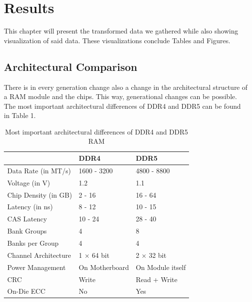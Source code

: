 \section{Results}

This chapter will present the transformed data we gathered while also showing visualization of said data. These visualizations conclude Tables and Figures.

\subsection{Architectural Comparison}

There is in every generation change also a change in the architectural structure of a RAM module and the chips. This way, generational changes can be possible. The most important architectural differences of DDR4 and DDR5 can be found in Table 1.

\begin{table}[H]
    \centering
    \begin{tabular}{|m{5cm}|P{3cm}|P{3cm}|}
    \hline
                         & \textbf{DDR4}  & \textbf{DDR5}    \\ \hline
    Data Rate (in MT/s)  & 1600 - 3200    & 4800 - 8800      \\ \hline
    Voltage (in V)       & 1.2            & 1.1              \\ \hline
    Chip Density (in GB) & 2 - 16         & 16 - 64          \\ \hline
    Latency (in ns)      & 8 - 12         & 10 - 15          \\ \hline
    CAS Latency          & 10 - 24        & 28 - 40          \\ \hline
    Bank Groups          & 4              & 8                \\ \hline
    Banks per Group      & 4              & 4                \\ \hline
    Channel Architecture & 1 × 64 bit     & 2 × 32 bit       \\ \hline
    Power Management     & On Motherboard & On Module itself \\ \hline
    CRC                  & Write          & Read + Write     \\ \hline
    On-Die ECC           & No             & Yes              \\ \hline
    
    \end{tabular}
    \caption{Most important architectural differences of DDR4 and DDR5 RAM \parencite{DDR4_DDR5_research, DDR4_DDR5_micron, RAM_latency_data, DDR4_DDR5_CAS, ddr5_overview_kingston}}
\end{table}

